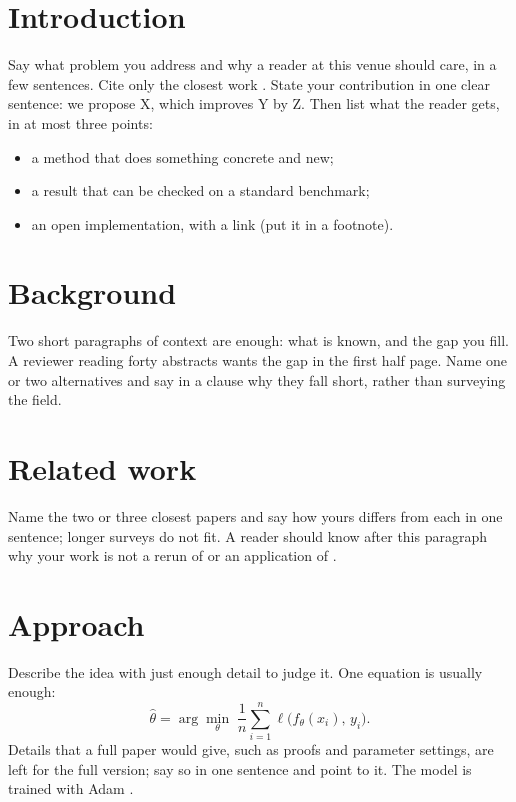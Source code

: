 \documentclass[10pt,a4paper,twocolumn]{article}
\begin{document}
\section{Introduction}
Say what problem you address and why a reader at this venue should care, in a few
sentences. Cite only the closest work \citep{he2016,vaswani2017}. State your
contribution in one clear sentence: we propose X, which improves Y by Z. Then list
what the reader gets, in at most three points:
\begin{itemize}\itemsep=0pt\topsep=2pt\parsep=0pt
  \item a method that does something concrete and new;
  \item a result that can be checked on a standard benchmark;
  \item an open implementation, with a link (put it in a footnote).
\end{itemize}


\section{Background}
Two short paragraphs of context are enough: what is known, and the gap you fill. A
reviewer reading forty abstracts wants the gap in the first half page. Name one or two
alternatives and say in a clause why they fall short, rather than surveying the field.

\section{Related work}
Name the two or three closest papers and say how yours differs from each in one sentence;
longer surveys do not fit. A reader should know after this paragraph why your work is not
a rerun of \citet{he2016} or an application of \citet{vaswani2017}.

\section{Approach}\label{sec:approach}
Describe the idea with just enough detail to judge it. One equation is usually enough:
\begin{equation}
  \hat{\theta} = \arg\min_{\theta}\; \frac{1}{n}\sum_{i=1}^{n} \ell\bigl(f_{\theta}(x_i),\, y_i\bigr).
  \label{eq:objective}
\end{equation}
Details that a full paper would give, such as proofs and parameter settings, are left
for the full version; say so in one sentence and point to it. The model is trained with
Adam \citep{kingma2015}.
\end{document}
